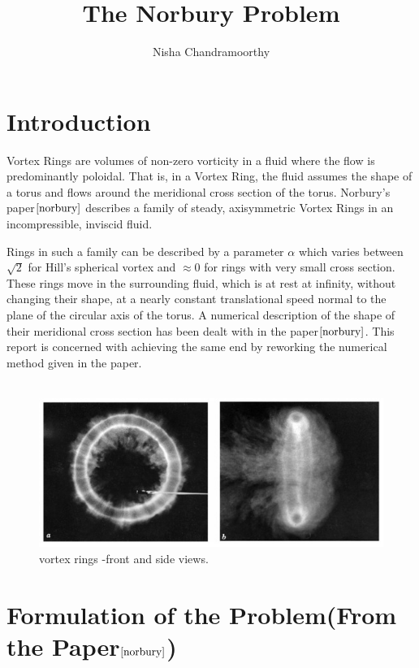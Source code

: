 \documentclass[10pt,a4paper,final]{report}
\author{Nisha Chandramoorthy}
\title{The Norbury Problem}
\begin{document}
\begin{titlepage}
\maketitle
\end{titlepage}

\section{Introduction}

Vortex Rings are volumes of non-zero vorticity in a fluid where the flow is predominantly poloidal. That is, in a Vortex Ring, the fluid assumes the shape of a torus and flows around the meridional cross section of the torus. Norbury's paper$\cite{norbury}$ describes a family of steady, axisymmetric Vortex Rings in an incompressible, inviscid fluid.

Rings in such a family can be described by a parameter $\alpha$ which varies between $\sqrt{2}$ for Hill's spherical vortex and $\approx 0$ for rings with very small cross section. These rings move in the surrounding fluid, which is at rest at infinity, without changing their shape, at a nearly constant translational speed normal to the plane of the circular axis of the torus. A numerical description of the shape of their meridional cross section has been dealt with in the paper$\cite{norbury}$. This report is concerned with achieving the same end by reworking the numerical method given in the paper.    
\\
\\
\begin{figure}


\includegraphics[scale=0.4]{rings.jpg}
\caption{vortex rings -front and side views.}

\end{figure}


\section{Formulation of the Problem(From the Paper$\cite{norbury}$)}
\end{document}
